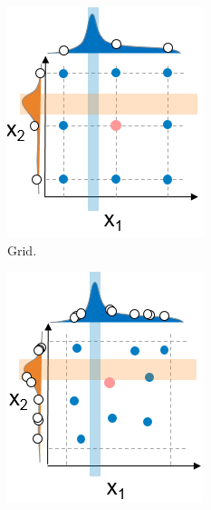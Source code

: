 \begin{figure}
	\centering
	\begin{subfigure}[b]{0.25\linewidth}
		\includegraphics[width=\linewidth]{graphics/Background/hyperparameter-grid-search.png}
		\caption{Grid.}
		\label{bg: fig:automated parameter tuning approaches: grid}
	\end{subfigure}
	\begin{subfigure}[b]{0.25\linewidth}
		\includegraphics[width=\linewidth]{graphics/Background/hyperparameter-random-search.png}

\end{subfigure}
\end{figure}
